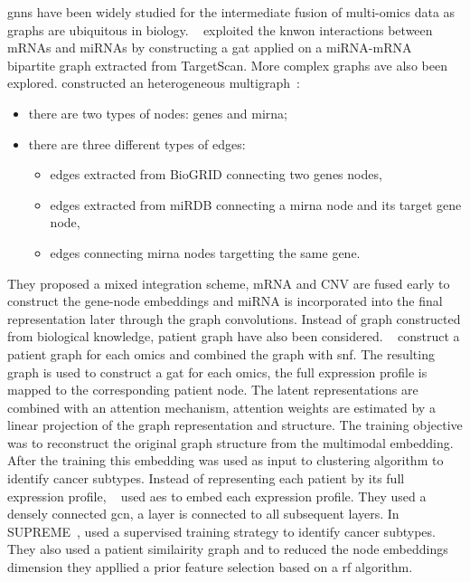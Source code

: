 \documentclass[../main.tex]{subfiles}
\begin{document}
			\Glspl{gnn} have been widely studied for the intermediate fusion of multi-omics data as graphs are ubiquitous in biology.
			\citeauthor{Kaczmarek2021}~\cite{Kaczmarek2021} exploited the knwon interactions between mRNAs and miRNAs by constructing a \gls{gat} applied on a miRNA-mRNA bipartite graph extracted from TargetScan.
			More complex graphs ave also been explored.
			\citeauthor{Li2024} constructed an heterogeneous multigraph~\cite{Li2024}:
			\begin{itemize}[nosep]
				\item there are two types of nodes: genes and \gls{mirna};
				\item there are three different types of edges:
					\begin{itemize}[nosep]
						\item edges extracted from BioGRID\cite{biogrid} connecting two genes nodes,
						\item edges extracted from miRDB\cite{mirdb} connecting a \gls{mirna} node and its target gene node,
						\item edges connecting \gls{mirna} nodes targetting the same gene.
					\end{itemize}
			\end{itemize}
			They proposed a mixed integration scheme, mRNA and CNV are fused early to construct the gene-node embeddings and miRNA is incorporated into the final representation later through the graph convolutions.
			Instead of graph constructed from biological knowledge, patient graph have also been considered.
			\citeauthor{MultiGATAE}~\cite{MultiGATAE} construct a patient graph for each omics and combined the graph with \gls{snf}.
			The resulting graph is used to construct a \gls{gat} for each omics, the full expression profile is mapped to the corresponding patient node.
			The latent representations are combined with an attention mechanism, attention weights are estimated by a linear projection of the graph representation and structure.
			The training objective was to reconstruct the original graph structure from the multimodal embedding.
			After the training this embedding was used as input to clustering algorithm to identify cancer subtypes.
			Instead of representing each patient by its full expression profile, \citeauthor{Zhang2022}~\cite{Zhang2022} used \glspl{ae} to embed each expression profile.
			They used a densely connected \gls{gcn}, a layer is connected to all subsequent layers.
			In SUPREME~\cite{Kesimoglu2022}, \citeauthor{Kesimoglu2022} used a supervised training strategy to identify cancer subtypes.
			They also used a patient similairity graph and to reduced the node embeddings dimension they appllied a prior feature selection based on a \gls{rf} algorithm.
\end{document}

